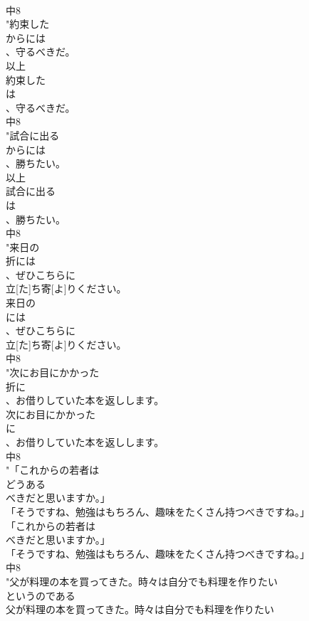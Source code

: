 \documentclass[8pt]{extreport}
\begin{document}
\begin{CJK}{UTF8}{min}
\\	中8
\\	"約束した
\\	からには
\\	、守るべきだ。
\\	以上
\\	約束した
\\	は
\\	、守るべきだ。
\\	中8
\\	"試合に出る
\\	からには
\\	、勝ちたい。 
\\	以上
\\	試合に出る
\\	は
\\	、勝ちたい。
\\	中8
\\	"来日の
\\	折には
\\	、ぜひこちらに
\\	立[た]ち寄[よ]りください。
\\	来日の
\\	には
\\	、ぜひこちらに
\\	立[た]ち寄[よ]りください。
\\	中8
\\	"次にお目にかかった
\\	折に
\\	、お借りしていた本を返しします。
\\	次にお目にかかった
\\	に
\\	、お借りしていた本を返しします。
\\	中8
\\	"「これからの若者は
\\	どうある
\\	べきだと思いますか。」
\\	「そうですね、勉強はもちろん、趣味をたくさん持つべきですね。」
\\	「これからの若者は
\\	べきだと思いますか。」
\\	「そうですね、勉強はもちろん、趣味をたくさん持つべきですね。」
\\	中8
\\	"父が料理の本を買ってきた。時々は自分でも料理を作りたい
\\	というのである
\\	父が料理の本を買ってきた。時々は自分でも料理を作りたい

\end{CJK}
\end{document}

